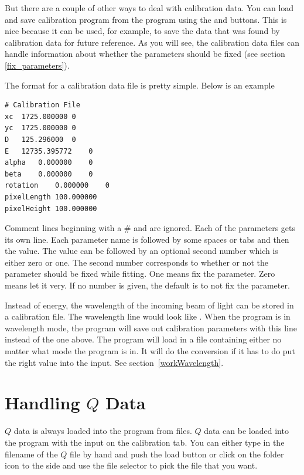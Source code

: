 But there are a couple of other ways to deal
with calibration data.
You can load and save calibration program
from the program using the 
and  buttons. This is nice
because it can be used, for example, to save 
the data that was found by calibration data
for future reference. As you will see, the 
calibration data files can handle information
about whether the parameters should be fixed
(see section \ref{fix_parameters}).

The format for a calibration data file is 
pretty simple. Below is  an example
\begin{lstlisting}[caption={Calibration Parameters}]
# Calibration File
xc	1725.000000	0
yc	1725.000000	0
D	125.296000	0
E	12735.395772	0
alpha	0.000000	0
beta	0.000000	0
rotation	0.000000	0
pixelLength	100.000000
pixelHeight	100.000000
\end{lstlisting}
Comment lines beginning with
a \# and are ignored. Each of the parameters
gets its own line. Each parameter name is 
followed by some spaces or tabs and then the
value. The value can be followed by an optional
second number which is either zero or one.
The second number corresponds to whether or
not the parameter should be fixed while
fitting. One means fix the parameter. Zero means
let it very. If no number is given, the default
is to not fix the parameter.

Instead of energy, the wavelength of the incoming
beam of light can be stored in a calibration file.
The wavelength line would look like 
.
When the program is in wavelength mode, the program
will save out calibration parameters with this line
instead of the one above. The program will load in a 
file containing either no matter what mode the program 
is in. It will do the conversion if it has to do put 
the right value into the input. See 
section~\ref{workWavelength}.


\section{\texorpdfstring{Handling $Q$ Data}{Handling Q Data}}
\label{TheQValues}

$Q$ data is always loaded into the program from files. 
$Q$ data can be loaded into the program with the 
input on the calibration tab. 
You can either type in the filename of the $Q$ file by hand 
and push the load button or click on the folder icon to the 
side and use the file selector to pick the file that you want.

